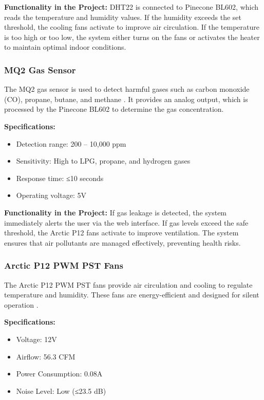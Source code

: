 \documentclass[a4paper]{scrartcl}
\begin{document}
\textbf{Functionality in the Project:}
DHT22 is connected to Pinecone BL602, which reads the temperature and humidity values. If the humidity exceeds the set threshold, the cooling fans activate to improve air circulation. If the temperature is too high or too low, the system either turns on the fans or activates the heater to maintain optimal indoor conditions.

\subsubsection{MQ2 Gas Sensor}
The MQ2 gas sensor is used to detect harmful gases such as carbon monoxide (CO), propane, butane, and methane \cite{r12}. It provides an analog output, which is processed by the Pinecone BL602 to determine the gas concentration.

\textbf{Specifications:}
\begin{itemize}
    \item Detection range: 200 – 10,000 ppm
    \item Sensitivity: High to LPG, propane, and hydrogen gases
    \item Response time: ≤10 seconds
    \item Operating voltage: 5V
\end{itemize}

\textbf{Functionality in the Project:}
If gas leakage is detected, the system immediately alerts the user via the web interface. If gas levels exceed the safe threshold, the Arctic P12 fans activate to improve ventilation. The system ensures that air pollutants are managed effectively, preventing health risks.

\subsubsection{Arctic P12 PWM PST Fans}
The Arctic P12 PWM PST fans provide air circulation and cooling to regulate temperature and humidity. These fans are energy-efficient and designed for silent operation \cite{r8}.

\textbf{Specifications:}
\begin{itemize}
    \item Voltage: 12V
    \item Airflow: 56.3 CFM
    \item Power Consumption: 0.08A
    \item Noise Level: Low (≤23.5 dB)
\end{itemize}
\end{document}
